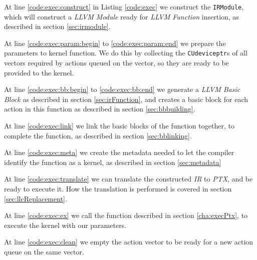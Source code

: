 At line \ref{code:exec:construct} in Listing \ref{code:exec} we construct the \texttt{IRModule}, which will construct a \textit{LLVM Module} ready for \textit{LLVM Function} insertion, as described in section \ref{sec:irmodule}.

At line \ref{code:exec:param:begin} to \ref{code:exec:param:end} we prepare the parameters to kernel function. We do this by collecting the \texttt{CUdeviceptr}s of all vectors required by actions queued on the vector, so they are ready to be provided to the kernel.

At line \ref{code:exec:bb:begin} to \ref{code:exec:bb:end} we generate a \textit{LLVM Basic Block} as described in section \ref{sec:irFunction}, and creates a basic block for each action in this function as described in section \ref{sec:bbbuilding}.

At line \ref{code:exec:link} we link the basic blocks of the function together, to complete the function, as described in section \ref{sec:bblinking}.

At line \ref{code:exec:meta} we create the metadata needed to let the compiler identify the function as a kernel, as described in section \ref{sec:metadata}

At line \ref{code:exec:translate} we can translate the constructed \textit{IR} to \textit{PTX}, and be ready to execute it. How the translation is performed is covered in section \ref{sec:llcReplacement}.

At line \ref{code:exec:ex} we call the function described in section \ref{cha:execPtx}, to execute the kernel with our parameters.

At line \ref{code:exec:clean} we empty the action vector to be ready for a new action queue on the same vector.

